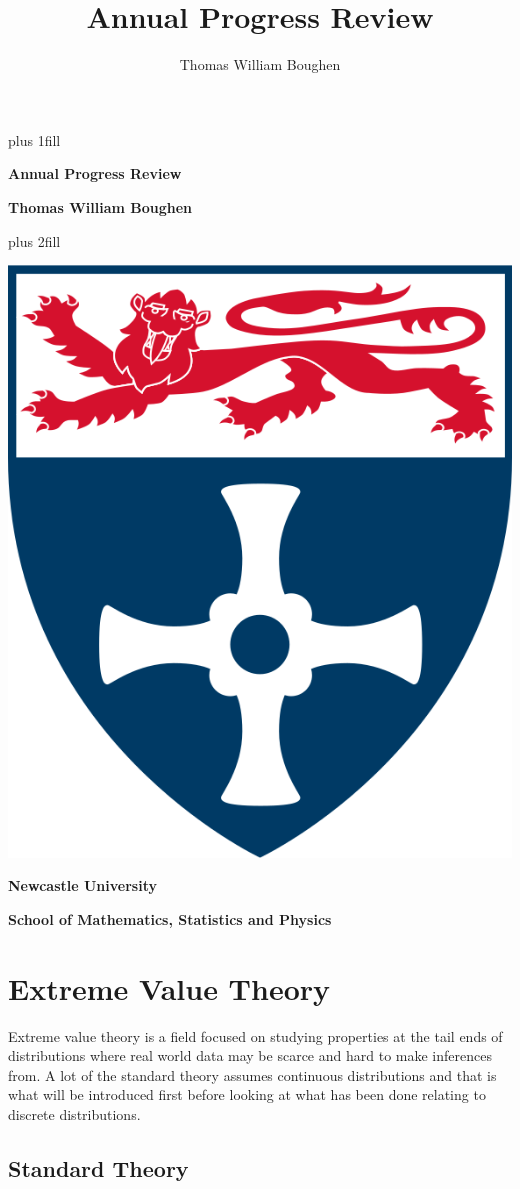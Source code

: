 \documentclass[
  10pt,
  a4paper,
]{scrreprt}
\title{Annual Progress Review}
\author{Thomas William Boughen}
\date{}
\theoremstyle{definition}
\theoremstyle{remark}
\begin{document}
\cleardoublepage
\thispagestyle{empty}
{\centering
\hbox{}\vskip 0cm plus 1fill
{\Huge\bfseries Annual Progress Review \par}
\vspace{12ex}
{\Large\bfseries Thomas William Boughen \par}
\vspace{3ex}
\vskip 0cm plus 2fill
\vspace{3ex}
{\bfseries\large  \par}
\vspace{12ex}
{\includegraphics[width=0.1\linewidth]{"imgs/University_of_Newcastle_Coat_of_Arms.png"}\par}
%
%
{\bfseries\large Newcastle University \par}
\vspace{3ex}
%
{\bfseries\large School of Mathematics, Statistics and Physics \par}
%
\vspace{12ex}
\justifying
\noindent\ifdefined\Shaded\renewenvironment{Shaded}{\begin{tcolorbox}[boxrule=0pt, breakable, frame hidden, borderline west={3pt}{0pt}{shadecolor}, enhanced, sharp corners, interior hidden]}{\end{tcolorbox}}\fi

\hypertarget{extreme-value-theory}{%
\chapter{Extreme Value Theory}\label{extreme-value-theory}}

Extreme value theory is a field focused on studying properties at the
tail ends of distributions where real world data may be scarce and hard
to make inferences from. A lot of the standard theory assumes continuous
distributions and that is what will be introduced first before looking
at what has been done relating to discrete distributions.

\hypertarget{standard-theory}{%
\section{Standard Theory}\label{standard-theory}}

}
\end{document}
